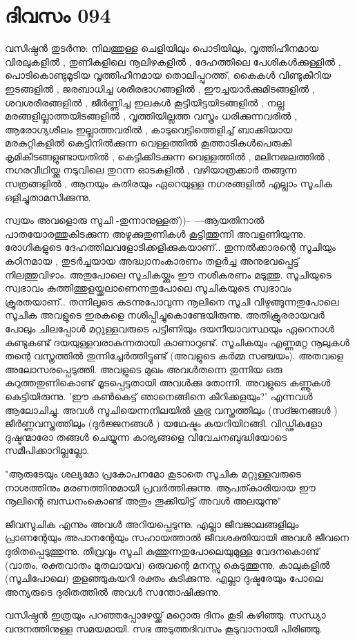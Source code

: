  
\section{ദിവസം 094}


വസിഷ്ഠന്‍ തുടര്‍ന്നു: നിലത്തുള്ള ചെളിയിലും പൊടിയിലും, വൃത്തിഹീനമായ വിരലുകളില്‍ , തുണികളിലെ നൂലിഴകളില്‍ , ദേഹത്തിലെ പേശികള്‍ക്കുള്ളില്‍ , പൊടികൊണ്ടുമൂടിയ വൃത്തിഹീനമായ തൊലിപ്പുറത്ത്‌, കൈകള്‍ വിണ്ടുകീറിയ ഇടങ്ങളില്‍ , ജരബാധിച്ച ശരീരഭാഗങ്ങളില്‍ , ഈച്ചയാര്‍ക്കുമിടങ്ങളില്‍ , ശവശരീരങ്ങളില്‍ , ജീര്‍ണ്ണിച്ച ഇലകള്‍ കൂട്ടിയിട്ടയിടങ്ങളില്‍ , നല്ല മരങ്ങളില്ലാത്തയിടങ്ങളില്‍ , വൃത്തിയില്ലത്ത വസ്ത്രം ധരിക്കുന്നവരില്‍ , ആരോഗ്യശീലം ഇല്ലാത്തവരില്‍ , കാടുവെട്ടിത്തെളിച്ച്‌ ബാക്കിയായ മരകുറ്റികളില്‍ കെട്ടിനില്‍ക്കുന്ന വെള്ളത്തില്‍ കൂത്താടികള്‍പെരുകി കൃമികീടങ്ങളുണ്ടായതില്‍ , കെട്ടിക്കിടക്കുന്ന വെള്ളത്തില്‍ , മലിനജലത്തില്‍ , നഗരവീഥിയ്ക്കു നടുവിലെ തുറന്ന ഓടകളില്‍ , വഴിയാത്രക്കാര്‍ തങ്ങുന്ന സത്രങ്ങളില്‍ , ആനയും കുതിരയും ഏറെയുള്ള നഗരങ്ങളില്‍ എല്ലാം സൂചിക ഒളിച്ചുതാമസിക്കുന്നു. 


സ്വയം അവളൊരു സൂചി -തുന്നാനുള്ളത്‌))-- ---ആയതിനാല്‍ പാതയോരത്തുകിടക്കുന്ന അഴുക്കുതുണികള്‍ കൂട്ടിത്തുന്നി അവളണിയുന്നു. രോഗികളുടെ ദേഹത്തിലവളോടിക്കളിക്കുകയാണ്‌..  തുന്നല്‍ക്കാരന്റെ സൂചിയും കഠിനമായ , തുടര്‍ച്ചയായ അദ്ധ്വാനംകാരണം തളര്‍ച്ച അനുഭവപ്പെട്ട്‌ നിലത്തുവിഴാം.  അതുപോലെ സൂചികയ്ക്കും ഈ നശീകരണം മടുത്തു. സൂചിയുടെ സ്വഭാവം കുത്തിത്തുളയ്ക്കലാണെന്നതുപോലെ സൂചികയുടെ സ്വഭാവം ക്രൂരതയാണ്‌..  തന്നിലൂടെ കടന്നുപോവുന്ന നൂലിനെ സൂചി വിഴുങ്ങുന്നതുപോലെ സൂചിക അവളുടെ ഇരകളെ നശിപ്പിച്ചുകൊണ്ടേയിരുന്നു. അതിക്രൂരരായവര്‍ പോലും ചിലപ്പോള്‍ മറ്റുള്ളവരുടെ പട്ടിണിയും ദയനീയാവസ്ഥയും ഏറെനാള്‍ കണ്ടുകണ്ട്‌ ദയയുള്ളവരാകുന്നതായി കാണാറുണ്ട്‌. സൂചികയും എണ്ണമറ്റ നൂലുകള്‍ തന്റെ വസ്ത്രത്തില്‍ തുന്നിച്ചേര്‍ത്തിട്ടുണ്ട്‌ (അവളുടെ കര്‍മ്മ സഞ്ചയം). അതവളെ അലോസരപ്പെടുത്തി. അവളുടെ മുഖം അവള്‍തന്നെ തുന്നിയ ഒരു കറുത്തതുണികൊണ്ട്‌ മൂടപ്പെട്ടതായി അവള്‍ക്കു തോന്നി. അവളുടെ കണ്ണൂകള്‍ കെട്ടിയിരുന്നു. 'ഈ കണ്‍കെട്ട്‌ ഞാനെങ്ങിനെ കീറിക്കളയും?' എന്നവള്‍ ആലോചിച്ചു. അവള്‍ സൂചിയെന്നനിലയില്‍  ശുഭ്ര വസ്ത്രത്തിലും (സദ്ജനങ്ങള്‍ ) ജീര്‍ണ്ണവസ്ത്രത്തിലും (ദുര്‍ജ്ജനങ്ങള്‍ ) യഥേഷ്ടം കയറിയിറങ്ങി. വിഡ്ഢികളോ ദുഷ്ടന്മാരോ തങ്ങള്‍ ചെയ്യുന്ന കാര്യങ്ങളെ വിവേചനബുദ്ധിയോടെ സമീപിക്കാറില്ലല്ലോ. 

"ആരുടേയും ശല്യമോ പ്രകോപനമോ കൂടാതെ സൂചിക മറ്റുള്ളവരുടെ നാശത്തിനും മരണത്തിനുമായി പ്രവര്‍ത്തിക്കുന്നു. ആപത്കാരിയായ ഈ നൂലിന്റെ ബന്ധനംകൊണ്ട്‌ അതും തൂക്കിയിട്ട്‌ അവള്‍ അലയുന്നു"

ജീവസൂചിക എന്നും അവള്‍ അറിയപ്പെടുന്നു. എല്ലാ ജീവജാലങ്ങളിലും പ്രാണന്റേയും അപാനന്റേയും സഹായത്താല്‍ ജീവശക്തിയായി അവള്‍ ജീവനെ ദുരിതപ്പെടുത്തുന്നു. തീവ്രവും സൂചി കുത്തുന്നതുപോലെയുമുള്ള വേദനകൊണ്ട്‌ (വാതം, രക്തവാതം മുതലായവ) ഒരുവന്റെ മനസ്സു കെടുത്തുന്നു. കാലുകളില്‍ (സൂചിപോലെ) തുളഞ്ഞുകയറി രക്തം കുടിക്കുന്നു. എല്ലാ ദുഷ്ടരേയും പോലെ അന്യരുടെ ദുരിതത്തില്‍ അവള്‍ സന്തോഷിക്കുന്നു. 

വസിഷ്ഠന്‍ ഇത്രയും പറഞ്ഞപ്പോഴേയ്ക്ക്‌ മറ്റൊരു ദിനം കൂടി കഴിഞ്ഞു. സന്ധ്യാ വന്ദനത്തിനുള്ള സമയമായി. സഭ അടുത്തദിവസം കൂടുവാനായി പിരിഞ്ഞു. 

